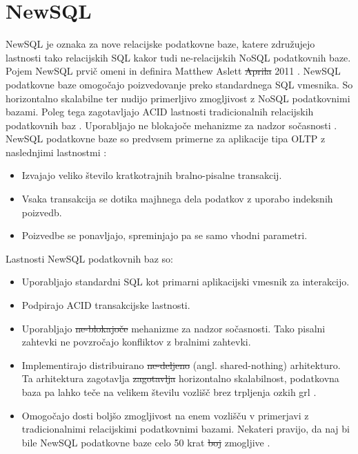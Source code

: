 \documentclass[a4paper, 12pt]{book}
\providecommand{\DIFaddtex}[1]{{\protect\color{blue}\uwave{#1}}} %
\providecommand{\DIFdeltex}[1]{{\protect\color{red}\sout{#1}}}                      %
\providecommand{\DIFaddbegin}{} %
\providecommand{\DIFaddend}{} %
\providecommand{\DIFdelbegin}{} %
\providecommand{\DIFdelend}{} %
\providecommand{\DIFadd}[1]{\texorpdfstring{\DIFaddtex{#1}}{#1}} %
\providecommand{\DIFdel}[1]{\texorpdfstring{\DIFdeltex{#1}}{}} %
\newcommand{\DIFscaledelfig}{0.5}
\newlength{\DIFdelgraphicswidth} %
\newlength{\DIFdelgraphicsheight} %
\newcommand{\DIFaddincludegraphics}[2][]{{\color{blue}\fbox{\DIFOincludegraphics[#1]{#2}}}} %
\newcommand{\DIFdelincludegraphics}[2][]{%
\sbox{\DIFdelgraphicsbox}{\DIFOincludegraphics[#1]{#2}}%
\settoboxwidth{\DIFdelgraphicswidth}{\DIFdelgraphicsbox} %
\settoboxtotalheight{\DIFdelgraphicsheight}{\DIFdelgraphicsbox} %
\scalebox{\DIFscaledelfig}{%
\parbox[b]{\DIFdelgraphicswidth}{\usebox{\DIFdelgraphicsbox}\\[-\baselineskip] \rule{\DIFdelgraphicswidth}{0em}}\llap{\resizebox{\DIFdelgraphicswidth}{\DIFdelgraphicsheight}{%
\setlength{\unitlength}{\DIFdelgraphicswidth}%
\begin{picture}(1,1)%
\thicklines\linethickness{2pt} %
{\color[rgb]{1,0,0}\put(0,0){\framebox(1,1){}}}%
{\color[rgb]{1,0,0}\put(0,0){\line( 1,1){1}}}%
{\color[rgb]{1,0,0}\put(0,1){\line(1,-1){1}}}%
\end{picture}%
}\hspace*{3pt}}} %
} %
\DeclareRobustCommand{\DIFaddbegin}{\DIFOaddbegin \let\includegraphics\DIFaddincludegraphics} %
\DeclareRobustCommand{\DIFaddend}{\DIFOaddend \let\includegraphics\DIFOincludegraphics} %
\DeclareRobustCommand{\DIFdelbegin}{\DIFOdelbegin \let\includegraphics\DIFdelincludegraphics} %
\DeclareRobustCommand{\DIFdelend}{\DIFOaddend \let\includegraphics\DIFOincludegraphics} %
\begin{document}
\chapter{NewSQL}
NewSQL je oznaka za nove relacijske podatkovne baze, katere združujejo lastnosti tako relacijskih SQL kakor tudi ne-relacijskih NoSQL podatkovnih baze. Pojem NewSQL prvič omeni in definira Matthew Aslett \DIFdelbegin \DIFdel{Aprila }\DIFdelend \DIFaddbegin \DIFadd{aprila }\DIFaddend 2011 \cite{Pavlo2016Sep}. NewSQL podatkovne baze omogočajo poizvedovanje preko standardnega SQL vmesnika. So horizontalno skalabilne ter nudijo primerljivo zmogljivost z NoSQL podatkovnimi bazami. Poleg tega zagotavljajo ACID lastnosti tradicionalnih relacijskih podatkovnih baz \cite{oliveira2017newsql}. Uporabljajo ne blokajoče mehanizme za nadzor sočasnosti \cite{NewSQLNewWayToHandleBigData}. NewSQL podatkovne baze so predvsem primerne za aplikacije tipa OLTP z naslednjimi lastnostmi \cite{Pavlo2016Sep}:
\begin{itemize}
    \item Izvajajo veliko število kratkotrajnih bralno-pisalne transakcij.
    \item Vsaka transakcija se dotika majhnega dela podatkov z uporabo indeksnih poizvedb.
    \item Poizvedbe se ponavljajo, spreminjajo pa se samo vhodni parametri.
\end{itemize}

Lastnosti NewSQL podatkovnih baz so:
\begin{itemize}
    \item Uporabljajo standardni SQL kot primarni aplikacijski vmesnik za interakcijo.
    \item Podpirajo ACID transakcijske lastnosti.
    \item Uporabljajo \DIFdelbegin \DIFdel{ne-blokajoče }\DIFdelend \DIFaddbegin \DIFadd{ne blokajoče }\DIFaddend mehanizme za nadzor sočasnosti. Tako pisalni zahtevki ne povzročajo konfliktov z bralnimi zahtevki.
    \item Implementirajo distribuirano \DIFdelbegin \DIFdel{ne-deljeno }\DIFdelend \DIFaddbegin \DIFadd{ne deljeno }\DIFaddend (angl. shared-nothing) arhitekturo. Ta arhitektura zagotavlja \DIFdelbegin \DIFdel{zagotavlja }\DIFdelend horizontalno skalabilnost, podatkovna baza pa lahko teče na velikem številu vozlišč brez trpljenja ozkih grl \cite{NewSQLNewWayToHandleBigData}.
    \item Omogočajo dosti boljšo zmogljivost na enem vozlišču v primerjavi z tradicionalnimi relacijskimi podatkovnimi bazami. Nekateri pravijo, da naj bi bile NewSQL podatkovne baze celo 50 krat \DIFdelbegin \DIFdel{boj }\DIFdelend \DIFaddbegin \DIFadd{bolj }\DIFaddend zmogljive \cite{Kumar2018Jun}.
\end{itemize}
\end{document}
